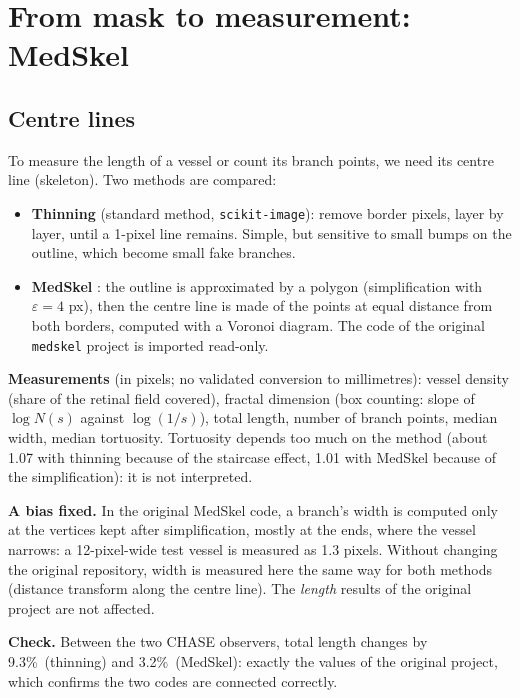 \documentclass[11pt,a4paper]{article}
\newcommand{\pct}{\%}
\begin{document}
\section{From mask to measurement: MedSkel}

\subsection{Centre lines}
To measure the length of a vessel or count its branch points, we need its centre line (skeleton). Two methods are compared:
\begin{itemize}
  \item \textbf{Thinning} (standard method, \texttt{scikit-image}): remove border pixels, layer by layer, until a 1-pixel line remains. Simple, but sensitive to small bumps on the outline, which become small fake branches.
  \item \textbf{MedSkel} \cite{saidou}: the outline is approximated by a polygon (simplification with $\varepsilon=4$ px), then the centre line is made of the points at equal distance from both borders, computed with a Voronoi diagram. The code of the original \texttt{medskel} project is imported read-only.
\end{itemize}

\textbf{Measurements} (in pixels; no validated conversion to millimetres): vessel density (share of the retinal field covered), fractal dimension (box counting: slope of $\log N(s)$ against $\log(1/s)$), total length, number of branch points, median width, median tortuosity. Tortuosity depends too much on the method (about 1.07 with thinning because of the staircase effect, 1.01 with MedSkel because of the simplification): it is not interpreted.

\textbf{A bias fixed.} In the original MedSkel code, a branch's width is computed only at the vertices kept after simplification, mostly at the ends, where the vessel narrows: a 12-pixel-wide test vessel is measured as 1.3 pixels. Without changing the original repository, width is measured here the same way for both methods (distance transform along the centre line). The \emph{length} results of the original project are not affected.

\textbf{Check.} Between the two CHASE observers, total length changes by 9.3\pct\ (thinning) and 3.2\pct\ (MedSkel): exactly the values of the original project, which confirms the two codes are connected correctly.
\end{document}
